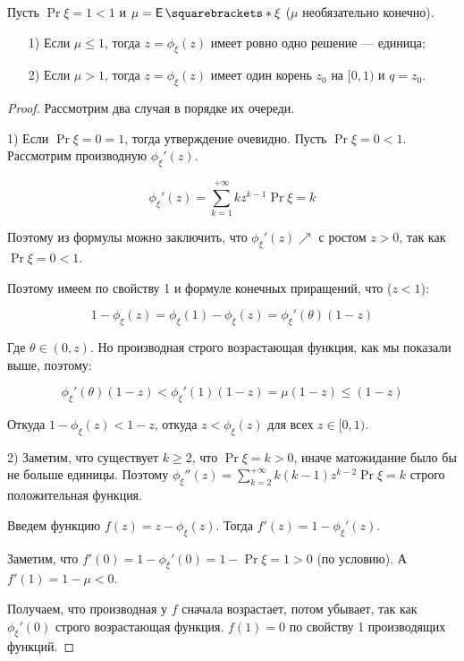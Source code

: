 \begin{theorem}
  Пусть $\Pr{\xi = 1} < 1$ и $\mu = \E{\xi}$ ($\mu$ необязательно конечно).

  \begin{itemize}
    \item[1)] Если $\mu \leq 1$, тогда $z = \phi_{\xi}(z)$  имеет ровно одно 
    решение --- единица;
    \item[2)] Если $\mu > 1$, тогда  $z = \phi_{\xi}(z)$ имеет один корень 
    $z_0$ на $[0, 1)$ и $q = z_0$.
  \end{itemize}
\end{theorem}

\begin{proof}
  Рассмотрим два случая в порядке их очереди.

  1) Если $\Pr{\xi = 0} = 1$, тогда утверждение очевидно. Пусть $\Pr{\xi = 0} < 1$.
  Рассмотрим производную $\phi_{\xi}'(z)$.

  \[
    \phi_{\xi}'(z) = \sum\limits_{k = 1}^{+\infty} kz^{k - 1}\Pr{\xi = k}
  \]

  Поэтому из формулы можно заключить, что $\phi_{\xi}'(z) \nearrow$ с ростом 
  $z > 0$, так как $\Pr{\xi = 0} < 1$.

  Поэтому имеем по свойству 1 и формуле конечных приращений, что ($z < 1$):

  \[
    1 - \phi_{\xi}(z) = \phi_{\xi}(1) - \phi_{\xi}(z) = \phi_{\xi}'(\theta)(1 - z)
  \]

  Где $\theta \in (0, z)$. Но производная строго возрастающая функция, как мы показали
  выше, поэтому:

  \[
    \phi_{\xi}'(\theta)(1 - z) < \phi_{\xi}'(1)(1 - z) = \mu (1 - z) \leq (1 - z)
  \]

  Откуда $1 - \phi_{\xi}(z) < 1 - z$, откуда $z < \phi_{\xi}(z)$ для всех $z \in [0, 1)$.

  2) Заметим, что существует $k \geq 2$, что $\Pr{\xi = k} > 0$, иначе матожидание
  было бы не больше единицы. Поэтому $\phi_{\xi}''(z) = \sum\limits_{k = 2}^{+\infty}
  k(k - 1)z^{k - 2}\Pr{\xi = k}$ строго положительная функция.

  Введем функцию $f(z) = z - \phi_{\xi}(z)$. Тогда $f'(z) = 1 - \phi_{\xi}'(z)$.

  Заметим, что $f'(0) = 1 - \phi_{\xi}'(0) = 1 - \Pr{\xi = 1} > 0$ (по условию).
  А $f'(1) =  1 - \mu < 0$.

  Получаем, что производная у $f$ сначала возрастает, потом убывает, так как
  $\phi_{\xi}'(0)$ строго возрастающая функция. $f(1) = 0$ по свойству 1 
  производящих функций.


\end{proof}
